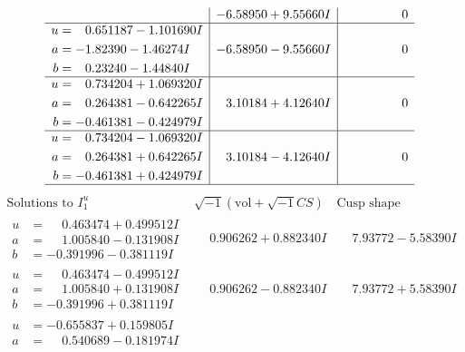 \documentclass[1p]{elsarticle_modified}
\theoremstyle{definition}
\newcommand{\I}{\sqrt{-1}}
\begin{document}
$$\begin{array}{c|c|c}
 & -6.58950 + 9.55660 I & \phantom{-0.000000 } 0 \\ \hline\begin{aligned}
u &= \phantom{-}0.651187 - 1.101690 I \\
a &= -1.82390 - 1.46274 I \\
b &= \phantom{-}0.23240 - 1.44840 I\end{aligned}
 & -6.58950 - 9.55660 I & \phantom{-0.000000 } 0 \\ \hline\begin{aligned}
u &= \phantom{-}0.734204 + 1.069320 I \\
a &= \phantom{-}0.264381 - 0.642265 I \\
b &= -0.461381 - 0.424979 I\end{aligned}
 & \phantom{-}3.10184 + 4.12640 I & \phantom{-0.000000 } 0 \\ \hline\begin{aligned}
u &= \phantom{-}0.734204 - 1.069320 I \\
a &= \phantom{-}0.264381 + 0.642265 I \\
b &= -0.461381 + 0.424979 I\end{aligned}
 & \phantom{-}3.10184 - 4.12640 I & \phantom{-0.000000 } 0\\
 \hline 
 \end{array}$$\newpage$$\begin{array}{c|c|c}  
\text{Solutions to }I^u_{1}& \I (\text{vol} + \sqrt{-1}CS) & \text{Cusp shape}\\
 \hline 
\begin{aligned}
u &= \phantom{-}0.463474 + 0.499512 I \\
a &= \phantom{-}1.005840 - 0.131908 I \\
b &= -0.391996 - 0.381119 I\end{aligned}
 & \phantom{-}0.906262 + 0.882340 I & \phantom{-}7.93772 - 5.58390 I \\ \hline\begin{aligned}
u &= \phantom{-}0.463474 - 0.499512 I \\
a &= \phantom{-}1.005840 + 0.131908 I \\
b &= -0.391996 + 0.381119 I\end{aligned}
 & \phantom{-}0.906262 - 0.882340 I & \phantom{-}7.93772 + 5.58390 I \\ \hline\begin{aligned}
u &= -0.655837 + 0.159805 I \\
a &= \phantom{-}0.540689 - 0.181974 I \\

\end{aligned}
\end{array}$$
\end{document}

